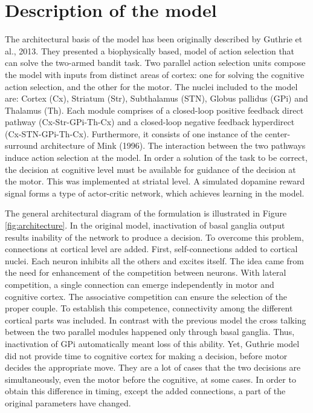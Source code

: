 \section{Description of the model}

	The architectural basis of the model has been originally described by Guthrie et al., 2013. They presented a biophysically based, model of action selection that can solve the two-armed bandit task. Two parallel action selection units compose the model with inputs from distinct areas of cortex: one for solving the cognitive action selection, and the other for the motor. The nuclei included to the model are: Cortex (Cx), Striatum (Str), Subthalamus (STN), Globus pallidus (GPi) and Thalamus (Th). Each module comprises of a closed-loop positive feedback direct pathway (Cx-Str-GPi-Th-Cx) and a closed-loop negative feedback hyperdirect (Cx-STN-GPi-Th-Cx). Furthermore, it consists of one instance of the center-surround architecture of Mink (1996). The interaction between the two pathways induce action selection at the model. In order a solution of the task to be correct, the decision at  cognitive level must be available for guidance of the decision at the motor. This was implemented at striatal level. A simulated dopamine reward signal forms a type of actor-critic network, which achieves learning in the model.

	The general architectural diagram of the formulation is illustrated in Figure \ref{fig:architecture}. In the original model, inactivation of basal ganglia output results inability of the network to produce a decision. To overcome this problem, connections at cortical level are added. 
	First, self-connections added to cortical nuclei. Each neuron inhibits all the others and excites itself. The idea came from the need for enhancement of the competition between neurons.
	 With lateral competition, a single connection can emerge independently in motor and cognitive cortex. The associative competition  can ensure the selection of the proper couple. To establish this competence, connectivity 	among the different cortical parts was included. In contrast with the previous model the cross talking between the two parallel modules happened only through basal ganglia. Thus, inactivation of GPi automatically meant loss of this ability. 
	Yet,  Guthrie model did not provide time to cognitive cortex for making a decision, before motor  decides the appropriate move. They are a lot of cases that the two decisions are simultaneously, even the motor before the cognitive, at some cases. In order to obtain this difference in timing, except the added connections, a part of the original parameters have changed. 
	
